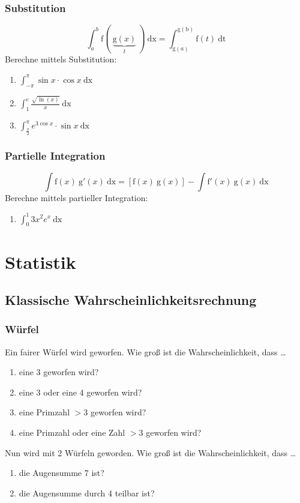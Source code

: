 \documentclass[11pt, a4paper]{article}
\newcommand{\dx}{\ \mathrm{dx}}
\newcommand{\dt}{\ \mathrm{dt}}
\begin{document}
\subsubsection{Substitution}
\[ \int_a^b \mathrm{f}( \ \underbrace{\mathrm{g}(x)}_t \ ) \dx = \int_{\mathrm{g}(a)}^{\mathrm{g(b)}} \mathrm{f}(t) \dt \]
Berechne mittels Substitution:
\begin{enumerate}
	\item $\int_{-\pi}^\pi \sin{x} \cdot \cos{x} \dx$
	\item $\int_1^e \frac{\sqrt{\ln(x)}}{x} \dx$
	\item $\int_\frac{\pi}{2}^\pi e^{3 \cos x} \cdot \sin x \dx$
\end{enumerate}

\subsubsection{Partielle Integration}
\[ \int \mathrm{f}(x) \ \mathrm{g}'(x) \dx = \left[ \mathrm{f}(x) \ \mathrm{g}(x) \right] - \int \mathrm{f}'(x) \ \mathrm{g}(x) \dx \]
Berechne mittels partieller Integration:
\begin{enumerate}
	\item $\int_0^1 3x^2 e^x \dx$
\end{enumerate}

\newpage
\section{Statistik}
\subsection{Klassische Wahrscheinlichkeitsrechnung}
\subsubsection{Würfel}
Ein fairer Würfel wird geworfen. Wie groß ist die Wahrscheinlichkeit, dass \dots
\begin{enumerate}
	\item eine 3 geworfen wird?
	\item eine 3 oder eine 4 geworfen wird?
	\item eine Primzahl $> 3$ geworfen wird?
	\item eine Primzahl oder eine Zahl $> 3$ geworfen wird?
\end{enumerate}
Nun wird mit 2 Würfeln geworden. Wie groß ist die Wahrscheinlichkeit, dass \dots
\begin{enumerate}
	\item die Augensumme 7 ist?
	\item die Augensumme durch 4 teilbar ist?
\end{enumerate}
\end{document}

